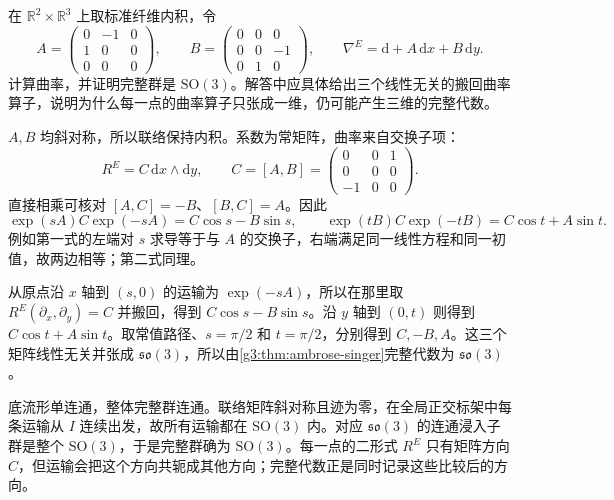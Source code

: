\begin{exercise}\label{g3:ex:constant-connection-full-so3}
	在 \(\mathbb R^2\times\mathbb R^3\) 上取标准纤维内积，令
	\[
		A=\begin{pmatrix}0&-1&0\\1&0&0\\0&0&0\end{pmatrix},
		\qquad B=\begin{pmatrix}0&0&0\\0&0&-1\\0&1&0\end{pmatrix},
		\qquad\nabla^E=\mathrm d+A\,\mathrm dx+B\,\mathrm dy.
	\]
	计算曲率，并证明完整群是 \(\mathrm{SO}(3)\)。解答中应具体给出三个线性无关的搬回曲率算子，说明为什么每一点的曲率算子只张成一维，仍可能产生三维的完整代数。
\end{exercise}
\begin{solution}
	\(A,B\) 均斜对称，所以联络保持内积。系数为常矩阵，曲率来自交换子项：
	\[
		R^E=C\,\mathrm dx\wedge\mathrm dy,
		\qquad C=[A,B]
		=\begin{pmatrix}0&0&1\\0&0&0\\-1&0&0\end{pmatrix}.
	\]
	直接相乘可核对 \([A,C]=-B\)、\([B,C]=A\)。因此
	\[
		\exp(sA)C\exp(-sA)=C\cos s-B\sin s,
		\qquad
		\exp(tB)C\exp(-tB)=C\cos t+A\sin t.
	\]
	例如第一式的左端对 \(s\) 求导等于与 \(A\) 的交换子，右端满足同一线性方程和同一初值，故两边相等；第二式同理。

	从原点沿 \(x\) 轴到 \((s,0)\) 的运输为 \(\exp(-sA)\)，所以在那里取 \(R^E(\partial_x,\partial_y)=C\) 并搬回，得到 \(C\cos s-B\sin s\)。沿 \(y\) 轴到 \((0,t)\) 则得到 \(C\cos t+A\sin t\)。取常值路径、\(s=\pi/2\) 和 \(t=\pi/2\)，分别得到 \(C,-B,A\)。这三个矩阵线性无关并张成 \(\mathfrak{so}(3)\)，所以由\cref{g3:thm:ambrose-singer}完整代数为 \(\mathfrak{so}(3)\)。

	底流形单连通，整体完整群连通。联络矩阵斜对称且迹为零，在全局正交标架中每条运输从 \(I\) 连续出发，故所有运输都在 \(\mathrm{SO}(3)\) 内。对应 \(\mathfrak{so}(3)\) 的连通浸入子群是整个 \(\mathrm{SO}(3)\)，于是完整群确为 \(\mathrm{SO}(3)\)。每一点的二形式 \(R^E\) 只有矩阵方向 \(C\)，但运输会把这个方向共轭成其他方向；完整代数正是同时记录这些比较后的方向。
\end{solution}

